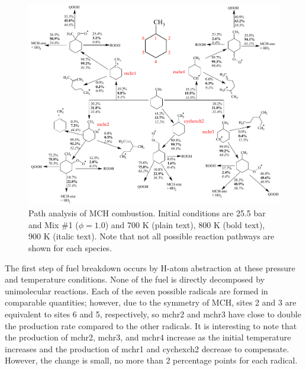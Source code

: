 \documentclass[12pt, letterpaper]{article}
\begin{document}
\begin{figure}
    \centering
    \includegraphics[width=\textwidth]{../figures/05-MCH/mch-path}
    \caption{Path analysis of MCH combustion. Initial conditions are 25.5 bar
    and Mix \#1 ($\phi=1.0$) and 700 K (plain text), 800 K (bold text), 900 K
    (italic text). Note that not all possible reaction pathways are shown for
    each species.}
    \label{fig:mch-path}
\end{figure}

The first step of fuel breakdown occurs by H-atom abstraction at these pressure
and temperature conditions. None of the fuel is directly decomposed by
unimolecular reactions. Each of the seven possible radicals are formed in
comparable quantities; however, due to the symmetry of MCH, sites 2 and 3 are
equivalent to sites 6 and 5, respectively, so mchr2 and mchr3 have close to
double the production rate compared to the other radicals. It is interesting to
note that the production of mchr2, mchr3, and mchr4 increase as the initial
temperature increases and the production of mchr1 and cychexch2 decrease to
compensate. However, the change is small, no more than 2 percentage points for
each radical.
\end{document}
